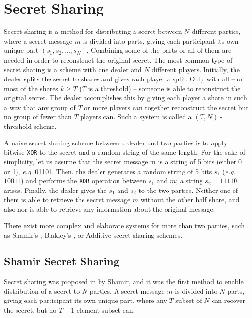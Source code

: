 \section{Secret Sharing}\label{s:secret-sharing}
Secret sharing is a method for distributing a secret between $N$ different parties, where a secret message $m$ is divided into parts, giving each participant its own unique part $(s_1, s_2, \dots, s_N)$.
Combining some of the parts or all of them are needed in order to reconstruct the original secret.
The most common type of secret sharing is a scheme with one dealer and $N$ different players.
Initially, the dealer splits the secret to shares and gives each player a split.
Only with all -- or most of the shares $k \geq T$  ($T$ is a threshold) -- someone is able to reconstruct the original secret.
The dealer accomplishes this by giving each player a share in such a way that any group of $T$ or more players can together reconstruct the secret but no group of fewer than $T$ players can.
Such a system is called a $(T, N)$ - threshold scheme.

A naive secret sharing scheme between a dealer and two parties is to apply bitwise \texttt{XOR} to the secret and a random string of the same length.
For the sake of simplicity, let us assume that the secret message m is a string of 5 bits (either 0 or 1), \textit{e.g.} 01101.
Then, the dealer generates a random string of 5 bits $s_1$ (\textit{e.g.} $10011$) and performs the \texttt{XOR} operation between $s_1$ and $m$; a string $s_2 = 11110$ arises.
Finally, the dealer gives the $s_1$ and $s_2$ to the two parties.
Neither one of them is able to retrieve the secret message $m$ without the other half share, and also nor is able to retrieve any information about the original message.

There exist more complex and elaborate systems for more than two parties, such as Shamir’s \cite{shamir1979share}, Blakley’s \cite{blakley1994linear}, or Additive \cite{kim2003designs} secret sharing schemes.


\subsection{Shamir Secret Sharing}\label{ss:shamir-secret-sharing}
Secret sharing was proposed in \cite{shamir1979share} by Shamir, and it was the first method to enable distribution of a secret to $N$ parties.
A secret message $m$ is divided into $N$ parts, giving each participant its own unique part, where any $T$ subset of $N$ can recover the secret, but no $T-1$ element subset can.

